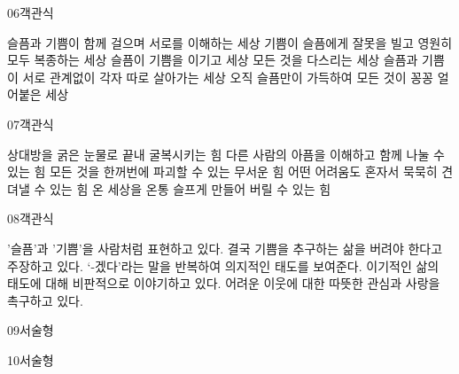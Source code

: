 \documentclass[fs9,seriesFre]{korfarm-base}
\begin{document}
\begin{kfQBlock}{06}{객관식}
\begin{kfChoices}
\kfChoice 슬픔과 기쁨이 함께 걸으며 서로를 이해하는 세상
\kfChoice 기쁨이 슬픔에게 잘못을 빌고 영원히 모두 복종하는 세상
\kfChoice 슬픔이 기쁨을 이기고 세상 모든 것을 다스리는 세상
\kfChoice 슬픔과 기쁨이 서로 관계없이 각자 따로 살아가는 세상
\kfChoice 오직 슬픔만이 가득하여 모든 것이 꽁꽁 얼어붙은 세상
\end{kfChoices}
\end{kfQBlock}
\begin{kfQBlock}{07}{객관식}
\begin{kfChoices}
\kfChoice 상대방을 굵은 눈물로 끝내 굴복시키는 힘
\kfChoice 다른 사람의 아픔을 이해하고 함께 나눌 수 있는 힘
\kfChoice 모든 것을 한꺼번에 파괴할 수 있는 무서운 힘
\kfChoice 어떤 어려움도 혼자서 묵묵히 견뎌낼 수 있는 힘
\kfChoice 온 세상을 온통 슬프게 만들어 버릴 수 있는 힘
\end{kfChoices}
\end{kfQBlock}
\begin{kfQBlock}{08}{객관식}
\begin{kfChoices}
\kfChoice '슬픔'과 '기쁨'을 사람처럼 표현하고 있다.
\kfChoice 결국 기쁨을 추구하는 삶을 버려야 한다고 주장하고 있다.
\kfChoice ‘-겠다’라는 말을 반복하여 의지적인 태도를 보여준다.
\kfChoice 이기적인 삶의 태도에 대해 비판적으로 이야기하고 있다.
\kfChoice 어려운 이웃에 대한 따뜻한 관심과 사랑을 촉구하고 있다.
\end{kfChoices}
\end{kfQBlock}
\begin{kfQBlock}{09}{서술형}
\end{kfQBlock}
\begin{kfQBlock}{10}{서술형}
\end{kfQBlock}
\kfEndMC


\end{document}
